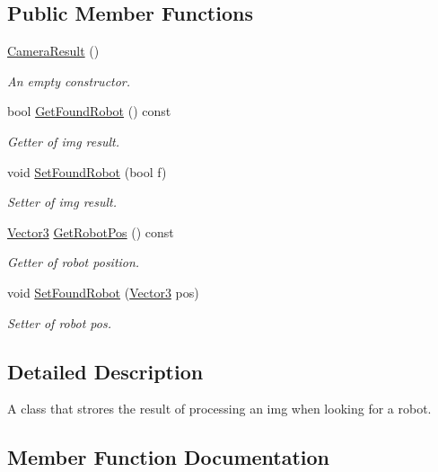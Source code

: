 \subsection*{Public Member Functions}
\begin{DoxyCompactItemize}
\item 
\mbox{\label{classCameraResult_aac91602d9a7322df55bf0e3bf0c32e39}} 
\hyperlink{classCameraResult_aac91602d9a7322df55bf0e3bf0c32e39}{Camera\+Result} ()
\begin{DoxyCompactList}\small\item\em An empty constructor. \end{DoxyCompactList}\item 
bool \hyperlink{classCameraResult_ab9285652d06715797fee95132a51fbf6}{Get\+Found\+Robot} () const
\begin{DoxyCompactList}\small\item\em Getter of img result. \end{DoxyCompactList}\item 
void \hyperlink{classCameraResult_a764f0b2b6fa57734ebf45703c79e071c}{Set\+Found\+Robot} (bool f)
\begin{DoxyCompactList}\small\item\em Setter of img result. \end{DoxyCompactList}\item 
\hyperlink{classVector3}{Vector3} \hyperlink{classCameraResult_a12314f7a760e9eaa5fd949afc3289d54}{Get\+Robot\+Pos} () const
\begin{DoxyCompactList}\small\item\em Getter of robot position. \end{DoxyCompactList}\item 
void \hyperlink{classCameraResult_a669e85149ff4bf617c136afa57577bbf}{Set\+Found\+Robot} (\hyperlink{classVector3}{Vector3} pos)
\begin{DoxyCompactList}\small\item\em Setter of robot pos. \end{DoxyCompactList}\end{DoxyCompactItemize}


\subsection{Detailed Description}
A class that strores the result of processing an img when looking for a robot. 

\subsection{Member Function Documentation}
\mbox{\label{classCameraResult_ab9285652d06715797fee95132a51fbf6}} 
